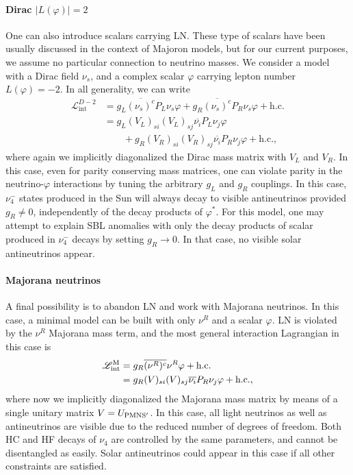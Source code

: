 \documentclass[
reprint,
superscriptaddress,
showpacs,
preprintnumbers,
nofootinbib,
nobibnotes,
amsmath,
amssymb, 
aps,
prd,
floatfix
]{revtex4-1}
\renewcommand{\phi}{\varphi}
\begin{document}
\paragraph{Dirac $|L(\phi)|=2$} One can also introduce scalars carrying LN. These type of scalars have been usually discussed in the context of Majoron models, but for our current purposes, we assume no particular connection to neutrino masses. We consider a model with a Dirac field $\nu_s$, and a complex scalar $\phi$ carrying lepton number $L(\phi)=-2$. In all generality, we can write
\begin{align}\label{eq:LD2}
     \mathscr{L}_{\text{int}}^{D-2} &= g_L \overline{(\nu_s)^c} P_L \nu_s \phi + g_R \overline{(\nu_s)^c} P_R \nu_s \phi + \text{h.c.} 
     \\\nonumber
     &= g_L (V_L)_{si}(V_L)_{sj} \overline{\nu_i}P_L\nu_j \phi 
     \\\nonumber &\qquad + g_R (V_R)_{si} (V_R)_{sj} \overline{\nu_i}P_R\nu_j \phi +\text{h.c.},
\end{align}
where again we implicitly diagonalized the Dirac mass matrix with $V_L$ and $V_R$. In this case, even for parity conserving mass matrices, one can violate parity in the neutrino-$\phi$ interactions by tuning the arbitrary $g_L$ and $g_R$ couplings. In this case, 
$\nu_4^-$ states produced in the Sun will always decay to visible antineutrinos provided $g_R\neq0$, independently of the decay products of $\phi^*$. For this model, one may attempt to explain SBL anomalies with only the decay products of scalar produced in $\nu_4^-$ decays by setting $g_R \to 0$. In that case, no visible solar antineutrinos appear. 

\paragraph{Majorana neutrinos} A final possibility is to abandon LN and work with Majorana neutrinos. In this case, a minimal model can be built with only $\nu^R$ and a scalar $\phi$. LN is violated by the $\nu^R$ Majorana mass term, and the most general interaction Lagrangian in this case is 
\begin{align}\label{eq:Lmaj}
     \mathscr{L}_{\text{int}}^{\rm M} &= g_R \overline{(\nu^R)^c} \nu^R \phi + \text{h.c.} 
     \\\nonumber
     &= g_R (V)_{si} (V)_{sj} \overline{\nu_i}P_R\nu_j \phi +\text{h.c.},
\end{align}
where now we implicitly diagonalized the Majorana mass matrix by means of a single unitary matrix $V=U_{\rm PMNS^\prime}$. In this case, all light neutrinos as well as antineutrinos are visible due to the reduced number of degrees of freedom. Both HC and HF decays of $\nu_4$ are controlled by the same parameters, and cannot be disentangled as easily. Solar antineutrinos could appear in this case if all other constraints are satisfied.
\end{document}
